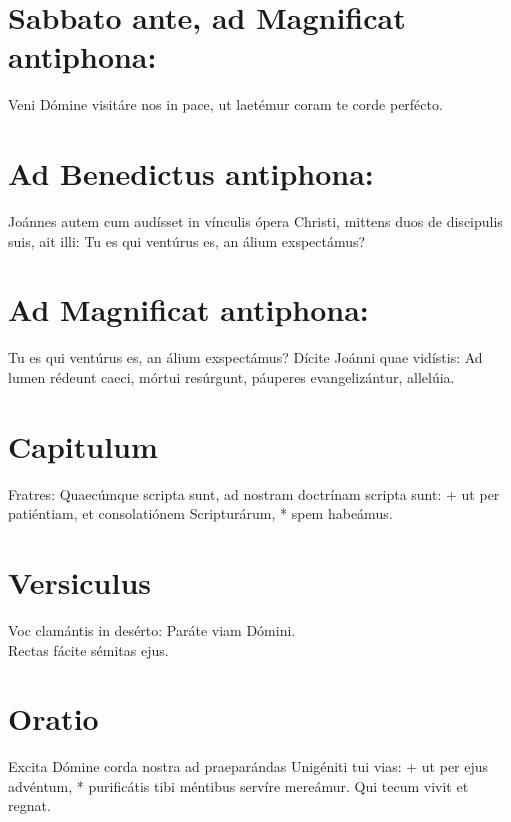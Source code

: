 \documentclass[a4paper, twoside, 12pt]{article}
\begin{document}
\section{Sabbato ante, ad Magnificat antiphona:}

Veni Dómine visitáre nos in pace,
ut laetémur coram te corde perfécto.

\section{Ad Benedictus antiphona:}

Joánnes autem cum audísset in vínculis ópera Christi,
mittens duos de discipulis suis, ait illi:
Tu es qui ventúrus es, an álium exspectámus?

\section{Ad Magnificat antiphona:}

Tu es qui ventúrus es, an álium exspectámus?
Dícite Joánni quae vidístis:
Ad lumen rédeunt caeci,
mórtui resúrgunt, 
páuperes evangelizántur, allelúia.

\section{Capitulum}

Fratres: Quaecúmque scripta sunt, ad nostram doctrínam scripta sunt: +
ut per patiéntiam, et consolatiónem Scripturárum, * spem habeámus.

\section{Versiculus}

Voc clamántis in desérto: Paráte viam Dómini.\\
Rectas fácite sémitas ejus.

\section{Oratio}

Excita Dómine corda nostra ad praeparándas Unigéniti tui vias: +
ut per ejus advéntum, * 
purificátis tibi méntibus servíre mereámur. 
Qui tecum vivit et regnat.
\end{document}
